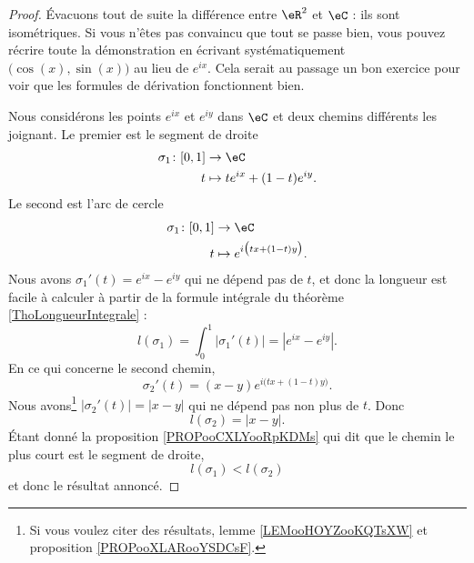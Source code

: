 \begin{proof}
    Évacuons tout de suite la différence entre \( \eR^2\) et \( \eC\) : ils sont isométriques. Si vous n'êtes pas convaincu que tout se passe bien, vous pouvez récrire toute la démonstration en écrivant systématiquement \( \big( \cos(x),\sin(x) \big)\) au lieu de \(  e^{ix}\). Cela serait au passage un bon exercice pour voir que les formules de dérivation fonctionnent bien.
    
    Nous considérons les points \(  e^{ix}\) et \(  e^{iy}\) dans \( \eC\) et deux chemins différents les joignant. Le premier est le segment de droite
    \begin{equation}
        \begin{aligned}
            \sigma_1\colon \mathopen[ 0 , 1 \mathclose]&\to \eC \\
            t&\mapsto t e^{ix}+(1-t) e^{iy}. 
        \end{aligned}
    \end{equation}
    Le second est l'arc de cercle
    \begin{equation}
        \begin{aligned}
            \sigma_1\colon \mathopen[ 0 , 1 \mathclose]&\to \eC \\
            t&\mapsto  e^{i\big( tx+(1-t)y \big)}. 
        \end{aligned}
    \end{equation}
    Nous avons \( \sigma_1'(t)= e^{ix}- e^{iy}\) qui ne dépend pas de \( t\), et donc la longueur est facile à calculer à partir de la formule intégrale du théorème \ref{ThoLongueurIntegrale} :
    \begin{equation}
        l(\sigma_1)=\int_0^1| \sigma_1'(t) |=|  e^{ix}- e^{iy} |.
    \end{equation}
    En ce qui concerne le second chemin,
    \begin{equation}
        \sigma_2'(t)=(x-y) e^{i\big( tx+(1-t)y \big)}.
    \end{equation}
    Nous avons\footnote{Si vous voulez citer des résultats, lemme \ref{LEMooHOYZooKQTsXW} et proposition \ref{PROPooXLARooYSDCsF}.} \( | \sigma_2'(t) |=| x-y |\) qui ne dépend pas non plus de \( t\). Donc
    \begin{equation}
        l(\sigma_2)=| x-y |.
    \end{equation}
    Étant donné la proposition \ref{PROPooCXLYooRpKDMs} qui dit que le chemin le plus court est le segment de droite,
    \begin{equation}
        l(\sigma_1)<l(\sigma_2) 
    \end{equation}
    et donc le résultat annoncé.
\end{proof}

